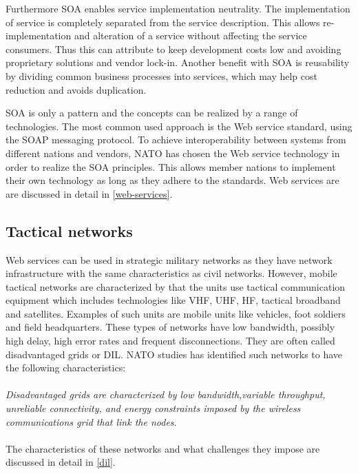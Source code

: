 \documentclass[USenglish]{article}
\begin{document}
Furthermore SOA enables service implementation neutrality. The implementation of service is completely separated from the service description. This allows re-implementation and alteration of a service without affecting the service consumers. Thus this can attribute to keep development costs low and avoiding proprietary solutions and vendor lock-in. Another benefit with SOA is reusability by dividing common business processes into services, which may help cost reduction and avoids duplication. 

SOA is only a pattern and the concepts can be realized by a range of technologies. The most common used approach is the Web service standard, using the SOAP messaging protocol. To achieve interoperability between systems from different nations and vendors, NATO has chosen the Web service technology in order to realize the SOA principles. This allows member nations to implement their own technology as long as they adhere to the standards. Web services are are discussed in detail in \cref{web-services}.

\subsection{Tactical networks}
Web services can be used in strategic military networks as they have network infrastructure with the same characteristics as civil networks. However, mobile tactical networks are characterized by that the units use tactical communication equipment which includes technologies like VHF, UHF, HF, tactical broadband and satellites. Examples of such units are mobile units like vehicles, foot soldiers and field headquarters. These types of networks have low bandwidth, possibly high delay, high error rates and frequent disconnections. They are often called disadvantaged grids or DIL. NATO studies has identified such networks to have the following characteristics:

\paragraph{}
\textit{Disadvantaged grids are characterized by low bandwidth,variable throughput, unreliable connectivity, and energy constraints imposed by the wireless communications grid that link the nodes}\cite{nato-disadvantaged-grids}.

\paragraph{}
The characteristics of these networks and what challenges they impose are discussed in detail in \cref{dil}.
\end{document}
